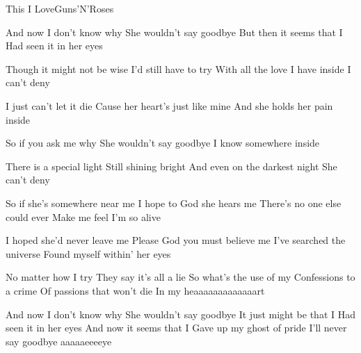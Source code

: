 \documentclass[a4paper,11pt,french]{article}
\begin{document}

\begin{Song}{This I Love}{Guns'N'Roses}
\begin{multicols}{2}

\begin{Verse}
And now I don't know why
She wouldn't say goodbye
But then it seems that I
Had seen it in her eyes
\espaceInterStrophe

Though it might not be wise 
I'd still have to try
With all the love I have inside
I can't deny
\espaceInterStrophe

I just can't let it die
Cause her heart's just like mine
And she holds her pain inside
\espaceInterStrophe

So if you ask me why
She wouldn't say goodbye
I know somewhere inside
\espaceInterStrophe

There is a special light
Still shining bright
And even on the darkest night
She can't deny
\end{Verse}
\espaceInterStrophe

\begin{Chorus}
So if she's somewhere near me
I hope to God she hears me
There's no one else could ever 
Make me feel I'm so alive
\espaceInterStrophe

I hoped she'd never leave me
Please God you must believe me
I've searched the universe 
Found myself within' her eyes
\end{Chorus}
\espaceInterStrophe

\begin{Verse}
No matter how I try
They say it's all a lie
So what's the use of my
Confessions to a crime
Of passions that won't die
In my heaaaaaaaaaaaaart
\end{Verse}
\espaceInterStrophe

\tochorus
\espaceInterStrophe

\espaceInterStrophe

\tochorus
\espaceInterStrophe

\begin{Verse}
And now I don't know why
She wouldn't say goodbye
It just might be that I
Had seen it in her eyes
And now it seems that I
Gave up my ghost of pride
I'll never say goodbye aaaaaeeeeye
\end{Verse}

\end{multicols}

\vfill


\end{Song}
\end{document}
